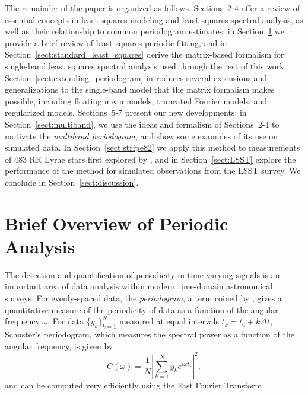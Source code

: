 \documentclass{emulateapj}
\newcommand{\eqlabel}[1]{\label{eq:#1}}
\newcommand{\Sect}[1]{Section~\ref{sect:#1}}
\newcommand{\sect}[1]{\Sect{#1}}
\newcommand{\sects}[1]{Sections~#1}
\newcommand{\sectlabel}[1]{\label{sect:#1}}
\newcommand{\new}[1]{{\color{red} #1}}
\begin{document}
The remainder of the paper is organized as follows. \new{\sects{2-4} offer a review of essential concepts in least squares modeling and least squares spectral analysis, as well as their relationship to common periodogram estimates:}
in \sect{brief_overview} we provide a brief review of least-squares periodic fitting, and in \sect{standard_least_squares} derive the matrix-based formalism for single-band least squares spectral analysis used through the rest of this work.
\sect{extending_periodogram} introduces several extensions and generalizations to the single-band model that the matrix formalism makes possible, including floating mean models, truncated Fourier models, and regularized models.
\new{\sects{5-7} present our new developments:}
in \sect{multiband}, we use the ideas and formalism of \sects{2-4} to motivate the {\it multiband periodogram}, and show some examples of its use on simulated data.
In \sect{stripe82} we apply this method to measurements of 483 RR Lyrae stars first explored by \citet[][hereafter S10]{Sesar2010}, and in \sect{LSST} explore the performance of the method for simulated observations from the LSST survey.
We conclude in \sect{discussion}.

\section{Brief Overview of Periodic Analysis}
\sectlabel{brief_overview}

The detection and quantification of periodicity in time-varying signals is an important area of data analysis within modern time-domain astronomical surveys.
For evenly-spaced data, the {\it periodogram}, a term coined by \citet{Schuster98}, gives a quantitative measure of the periodicity of data as a function of the angular frequency $\omega$. For data $\{y_k\}_{k=1}^N$ measured at equal intervals $t_k = t_0 + k\Delta t$, Schuster's periodogram, which measures the spectral power as a function of the angular frequency, is given by
\begin{equation}
  \eqlabel{Schuster}
  C(\omega) = \frac{1}{N}\left| \sum_{k=1}^N y_k e^{i\omega t_k} \right|^2,
\end{equation}
and can be computed very efficiently using the Fast Fourier Transform.
\end{document}
